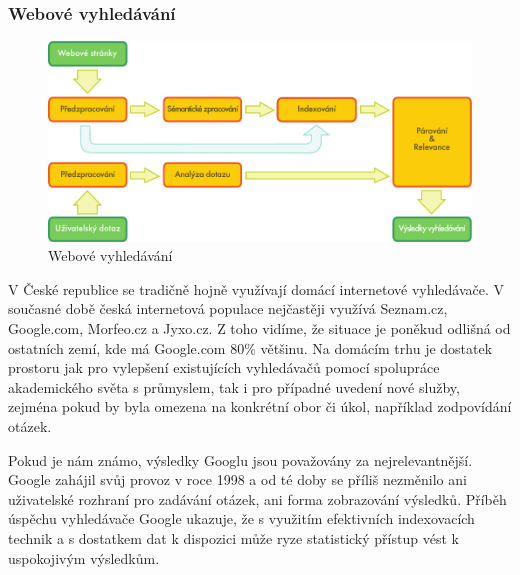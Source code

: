 \begin{multicols}{2}
\subsubsection{Webové vyhledávání}

\begin{figure}[htb]
  \center
  \includegraphics[width=\textwidth]{../_media/czech/web_search_architecture}
  \caption{Webové vyhledávání}
  \label{fig:websearcharch_cz}
\end{figure}

V České republice se tradičně hojně využívají domácí internetové vyhledávače. V současné době česká internetová populace nejčastěji využívá Seznam.cz, Google.com, Morfeo.cz a Jyxo.cz. Z toho vidíme, že situace je poněkud odlišná od ostatních zemí, kde má Google.com 80\% většinu. Na domácím trhu je dostatek prostoru jak pro vylepšení existujících vyhledávačů pomocí spolupráce akademického světa s průmyslem, tak i pro případné uvedení nové služby, zejména pokud by byla omezena na konkrétní obor či úkol, například zodpovídání otázek.

Pokud je nám známo, výsledky Googlu jsou považovány za nejrelevantnější. Google zahájil svůj provoz v roce 1998 a od té doby se příliš nezměnilo ani uživatelské rozhraní pro zadávání otázek, ani forma zobrazování výsledků. Příběh úspěchu vyhledávače Google ukazuje, že s využitím efektivních indexovacích technik a s dostatkem dat k dispozici může ryze statistický přístup vést k uspokojivým výsledkům.


\end{multicols}
